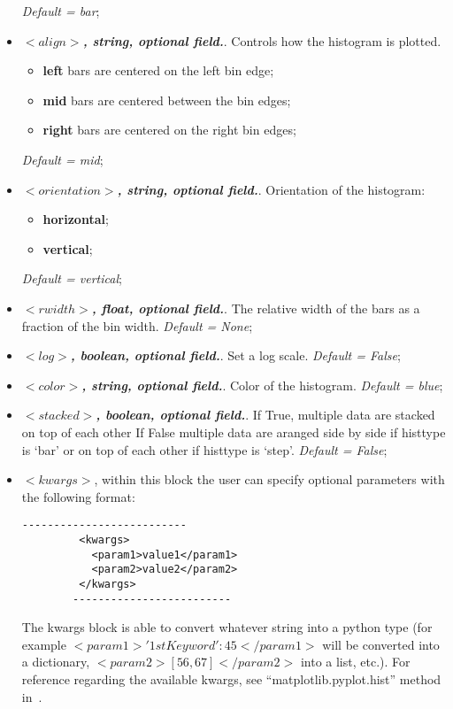 \begin{itemize}
\begin{itemize}
         \end{itemize}
        \textit{Default = bar};
     \item $<align>$\textbf{\textit{, string, optional  field.}}. Controls how the histogram is plotted.
         \begin{itemize}
         \item \textbf{left} bars are centered on the left bin edge;
         \item \textbf{mid}  bars are centered between the bin edges;
         \item \textbf{right} bars are centered on the right bin edges;
         \end{itemize}
         \textit{Default = mid};
     \item $<orientation>$\textbf{\textit{, string, optional  field.}}. Orientation of the histogram: 
         \begin{itemize}
         \item \textbf{horizontal};
         \item \textbf{vertical};
         \end{itemize}
          \textit{Default = vertical};
     \item $<rwidth>$\textbf{\textit{, float, optional  field.}}. The relative width of the bars as a fraction of the bin width. \textit{Default = None};
     \item $<log>$\textbf{\textit{, boolean, optional  field.}}. Set a log scale. \textit{Default = False};
     \item $<color>$\textbf{\textit{, string, optional  field.}}. Color of the histogram. \textit{Default = blue};
     \item $<stacked>$\textbf{\textit{, boolean, optional  field.}}. If True, multiple data are stacked on top of each other If False multiple data are aranged side by side if histtype is ‘bar’ or on top of each other if histtype is ‘step’. \textit{Default = False};
 \item \textit{$<kwargs>$},  within this block the user can specify optional parameters with the following format:
        \begin{lstlisting}[style=XML]
        --------------------------
         <kwargs>
           <param1>value1</param1>
           <param2>value2</param2>
         </kwargs>
        -------------------------
       \end{lstlisting}
         The kwargs block is able to convert whatever string into a python type (for example $<param1>{'1stKeyword':45}</param1>$ will be converted into a dictionary, $<param2>[56,67]</param2>$ into a list, etc.). For reference regarding the available kwargs, see ``matplotlib.pyplot.hist'' method in~\cite{MatPlotLib}.
    \end{itemize}

